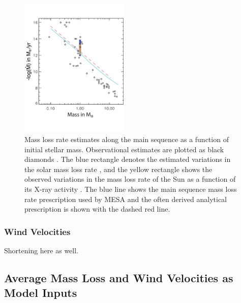 \documentclass[fleqn,usenatbib]{mnras}
\begin{document}
\begin{figure}
\centering\includegraphics[width=0.46\textwidth]{mdotms_withAnalytic_mod3.pdf}
\caption{Mass loss rate estimates along the main sequence as a function of initial stellar mass.  Observational estimates are plotted as black diamonds \citep{cranmer2011,dejager1988,searle2008,waters1987,debes2006,badalyan1992,morin2008}.  The blue rectangle denotes the estimated variations in the solar mass loss rate \citep{wood2005}, and the yellow rectangle shows the observed variations in the mass loss rate of the Sun as a function of its X-ray activity \citep{cohen2011}.  The blue line shows the main sequence mass loss rate prescription used by MESA and the often derived analytical prescription is shown with the dashed red line. }
\label{fig:msmassloss}
\end{figure} 


\subsubsection{Wind Velocities}


Shortening here as well.

\subsection{Average Mass Loss and Wind Velocities as Model Inputs} \label{section:averages}
\end{document}

